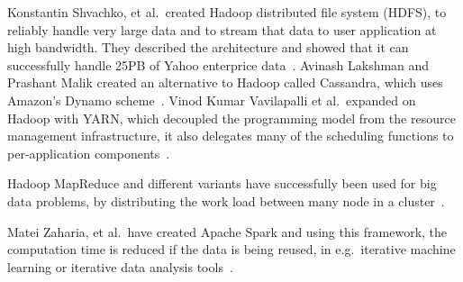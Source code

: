 Konstantin Shvachko, et al.\, created Hadoop distributed file system (HDFS), to reliably handle very large data and to stream that data to user application at high bandwidth. They described the architecture and showed that it can successfully handle 25PB of Yahoo enterprice data~\cite{HDFS}.
Avinash Lakshman and Prashant Malik created an alternative to Hadoop called Cassandra, which uses Amazon's Dynamo scheme~\cite{ApacheCassandra}.
Vinod Kumar Vavilapalli et al.\ expanded on Hadoop with YARN, which decoupled the programming model from the resource management infrastructure, it also delegates many of the scheduling functions to per-application components~\cite{ApacheHadoopYARN}.

Hadoop MapReduce and different variants have successfully been used for big data problems, by distributing the work load between many node in a cluster~\cite{DeanMapReduce}. 

Matei Zaharia, et al.\ have created Apache Spark and using this framework, the computation time is reduced if the data is being reused, in e.g.\ iterative machine learning or iterative data analysis tools~\cite{ApacheSpark}.


